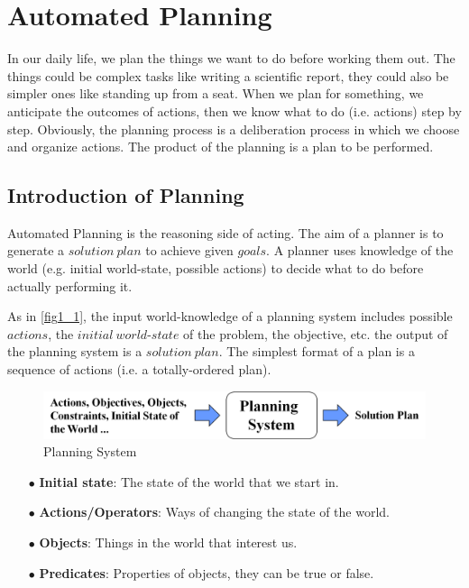 \chapter{Automated Planning}
\label{chapter1}
In our daily life, we plan the things we want to do before working them out. The things could be complex tasks like writing a scientific report, they could also be simpler ones like standing up from a seat. When we plan for something, we anticipate the outcomes of actions, then we know what to do (i.e. actions) step by step. Obviously, the planning process is a deliberation process in which we choose and organize actions. The product of the planning is a plan to be performed.

\section{Introduction of Planning}
Automated Planning is the reasoning side of acting. The aim of a planner is to generate a $solution\ plan$ to achieve given $goals$. A planner uses knowledge of the world (e.g. initial world-state, possible actions) to decide what to do before actually performing it.

As in \autoref{fig1_1}, the input world-knowledge of a planning system includes possible $actions$, the $initial\ world$-$state$ of the problem, the objective, etc. the output of the planning system is a $solution\ plan$. The simplest format of a plan is a sequence of actions (i.e. a totally-ordered plan).

\begin{figure}[H]
    \center
    \includegraphics[width=\textwidth]{./images/1_1.png}
    \caption{Planning System}
    \label{fig1_1}
\end{figure}

\begin{itemize}
\item[$\bullet$] \textbf{Initial state}: The state of the world that we start in.
\item[$\bullet$] \textbf{Actions/Operators}: Ways of changing the state of the world.
\item[$\bullet$] \textbf{Objects}: Things in the world that interest us.
\item[$\bullet$] \textbf{Predicates}: Properties of objects, they can be true or false.
\end{itemize}

